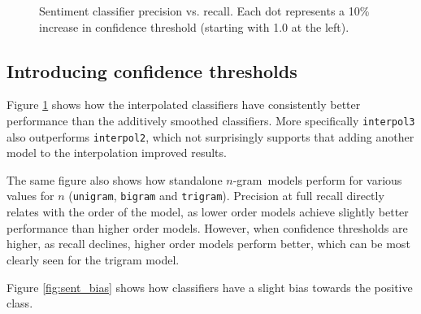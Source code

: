 \documentclass[a4paper,11pt]{kth-mag}
\newcommand{\ngram}{$n$-gram}
\begin{document}
\begin{figure}[h]
  \centering
  \caption{Sentiment classifier precision vs. recall. Each dot represents a
    10\% increase in confidence threshold (starting with 1.0 at the left).}
  \label{fig:sent_pr_curve} 
\end{figure}



\subsection{Introducing confidence thresholds}
Figure \ref{fig:sent_pr_curve} shows how the interpolated classifiers have
consistently better performance than the additively smoothed classifiers.
More specifically \texttt{interpol3} also outperforms \texttt{interpol2}, which
not surprisingly supports that adding another model to the interpolation improved results.

The same figure also shows how standalone \ngram~models perform for various values for $n$
(\texttt{unigram}, \texttt{bigram} and \texttt{trigram}).
Precision at full recall directly relates with the order of the model, as lower order
models achieve slightly better performance than higher order models.
However, when confidence thresholds are higher, as recall declines,
higher order models perform better, which can be most clearly seen for the trigram model.

Figure \ref{fig:sent_bias} shows how classifiers have a slight bias towards the positive class.
\end{document}
